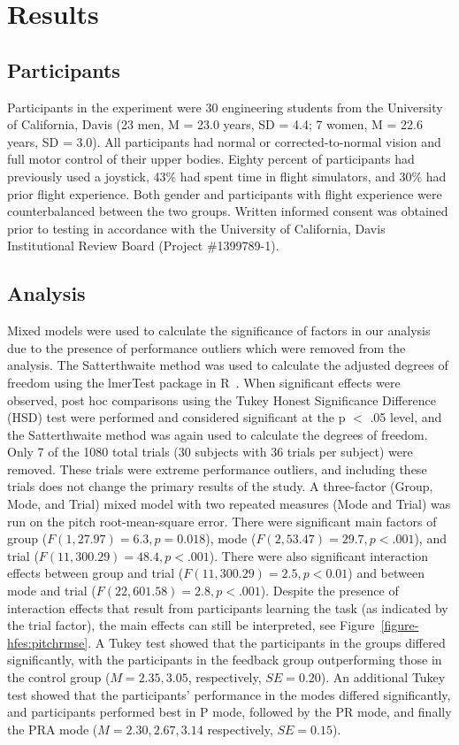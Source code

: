 \section{Results}
\subsection{Participants}
Participants in the experiment were 30 engineering students from the University of California, Davis (23 men, M = 23.0 years, SD = 4.4; 7 women, M = 22.6 years, SD = 3.0).
All participants had normal or corrected-to-normal vision and full motor control of their upper bodies.
Eighty percent of participants had previously used a joystick, 43\% had spent time in flight simulators, and 30\% had prior flight experience.
Both gender and participants with flight experience were counterbalanced between the two groups.
Written informed consent was obtained prior to testing in accordance with the University of California, Davis Institutional Review Board (Project \#1399789-1).

\subsection{Analysis}
Mixed models were used to calculate the significance of factors in our analysis due to the presence of performance outliers which were removed from the analysis.
The Satterthwaite method was used to calculate the adjusted degrees of freedom using the lmerTest package in R~\citep{RN53}.
When significant effects were observed, post hoc comparisons using the Tukey Honest Significance Difference (HSD) test were performed and considered significant at the p $<$ .05 level, and the Satterthwaite method was again used to calculate the degrees of freedom.
Only 7 of the 1080 total trials (30 subjects with 36 trials per subject) were removed.
These trials were extreme performance outliers, and including these trials does not change the primary results of the study.
A three-factor (Group, Mode, and Trial) mixed model with two repeated measures (Mode and Trial) was run on the pitch root-mean-square error.
There were significant main factors of group ($F(1, 27.97) = 6.3, p = 0.018$), mode ($F(2, 53.47) = 29.7, p < .001$), and trial ($F(11, 300.29) = 48.4, p < .001$).
There were also significant interaction effects between group and trial ($F(11, 300.29) = 2.5, p < 0.01$) and between mode and trial ($F(22, 601.58) = 2.8, p < .001$).
Despite the presence of interaction effects that result from participants learning the task (as indicated by the trial factor), the main effects can still be interpreted, see Figure~\ref{figure-hfes:pitchrmse}.
A Tukey test showed that the participants in the groups differed significantly, with the participants in the feedback group outperforming those in the control group ($M = 2.35, 3.05$, respectively, $SE = 0.20$).
An additional Tukey test showed that the participants' performance in the modes differed significantly, and participants performed best in P mode, followed by the PR mode, and finally the PRA mode ($M = 2.30, 2.67, 3.14$ respectively, $SE = 0.15$).

